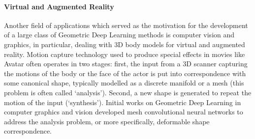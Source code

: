 





\paragraph{Virtual and Augmented Reality} 
Another field of applications which served as the motivation for the development of a large class of Geometric Deep Learning methods is computer vision and graphics, in particular, dealing with 3D body models for virtual and augmented reality. 
%
Motion capture technology used to produce special effects in movies like Avatar often operates in two stages: first, the input from a 3D scanner capturing the motions of the body or the face of the actor is put into correspondence with some canonical shape, typically modelled as a discrete manifold or a mesh (this problem is often called `analysis'). Second, a new shape is generated to repeat the motion of the input (`synthesis').  
%
Initial works on Geometric Deep Learning in computer graphics and vision \citep{masci2015geodesic,boscaini2016learning,monti2017geometric} developed mesh convolutional neural networks to address the analysis problem, or more specifically, deformable shape correspondence. 


